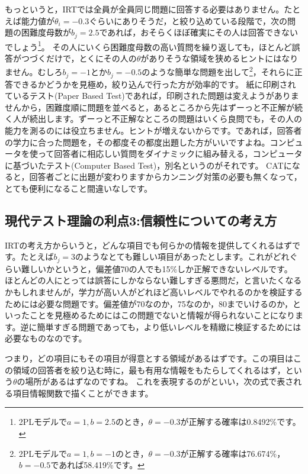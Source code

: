 \documentclass{ltjsbook}
\begin{document}
もっというと，IRTでは全員が全員同じ問題に回答する必要はありません。たとえば能力値が$\theta_i = -0.3$ぐらいにありそうだ，と絞り込めている段階で，次の問題の困難度母数が$b_j = 2.5$であれば，おそらくほぼ確実にその人は回答できないでしょう\footnote{2PLモデルで$a=1,b=2.5$のとき，$\theta=-0.3$が正解する確率は0.8492\%です。}。
その人にいくら困難度母数の高い質問を繰り返しても，ほとんど誤答がつづくだけで，とくにその人の$\theta$がありそうな領域を狭めるヒントにはなりません。むしろ$b_j=-1$とか$b_j=-0.5$のような簡単な問題を出して\footnote{2PLモデルで$a=1,b=-1$のとき，$\theta=-0.3$が正解する確率は76.674\%，$b=-0.5$であれば58.419\%です。}，それらに正答できるかどうかを見極め，絞り込んで行った方が効率的です。
紙に印刷されているテスト(Paper Based Test)であれば，印刷された問題は変えようがありませんから，困難度順に問題を並べると，あるところから先はずーっと不正解が続く人が続出します。ずーっと不正解なところの問題はいくら良問でも，その人の能力を測るのには役立ちません。ヒントが増えないからです。であれば，回答者の学力に合った問題を，その都度その都度出題した方がいいですよね。コンピュータを使って回答者に相応しい質問をダイナミックに組み替える，コンピュータに基づいたテスト(Computer Based Test)，別名というのがそれです。
CATになると，回答者ごとに出題が変わりますからカンニング対策の必要も無くなって，とても便利になること間違いなしです。

\subsection{現代テスト理論の利点3:信頼性についての考え方}
IRTの考え方からいうと，どんな項目でも何らかの情報を提供してくれるはずです。たとえば$b_j=3$のようなとても難しい項目があったとします。これがどれぐらい難しいかというと，偏差値70の人でも15\%しか正解できないレベルです。
ほとんどの人にとっては誤答にしかならない難しすぎる悪問だ，と言いたくなるかもしれませんが，学力が高い人がどれほど高いレベルでやれるのかを検証するためには必要な問題です。偏差値が70なのか，75なのか，80までいけるのか，といったことを見極めるためにはこの問題でないと情報が得られないことになります。逆に簡単すぎる問題であっても，より低いレベルを精緻に検証するためには必要なものなのです。

つまり，どの項目にもその項目が得意とする領域があるはずです。この項目はこの領域の回答者を絞り込む時に，最も有用な情報をもたらしてくれるはず，という$\theta$の場所があるはずなのですね。
これを表現するのがといい，次の式で表される項目情報関数で描くことができます。
\end{document}
